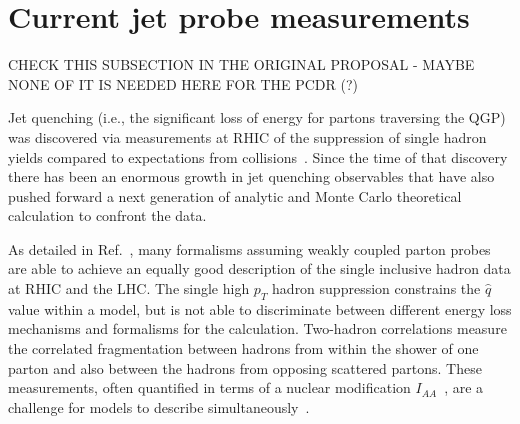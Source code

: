


\section{Current jet probe measurements}
 \label{currentjetdata}

CHECK THIS SUBSECTION IN THE ORIGINAL PROPOSAL - MAYBE NONE OF IT IS NEEDED HERE FOR THE PCDR (?)

 Jet quenching (i.e., the significant loss of energy for partons
 traversing the QGP) was discovered via measurements at RHIC of the
 suppression of single hadron yields compared to expectations from \pp
 collisions~\cite{Adcox:2001jp,Adler:2002xw}.  Since the time of that
 discovery there has been an enormous growth in jet quenching
 observables that have also pushed forward a next generation of
 analytic and Monte Carlo theoretical calculation to confront the
 data.

As detailed in Ref.~\cite{Adare:2008cg,Bass:2008rv}, many
formalisms assuming weakly coupled parton probes are able to achieve an equally
good description of the single inclusive hadron data at RHIC and the LHC.
The single high $p_T$ hadron suppression constrains
the $\hat{q}$ value within a model, but is not able to discriminate
between different energy loss mechanisms and formalisms for the
calculation.  Two-hadron correlations measure the correlated
fragmentation between hadrons from within the shower of one parton and
also between the hadrons from opposing scattered partons.  These
measurements, often quantified in terms of a nuclear modification
$I_{AA}$~\cite{Adare:2010ry,Adare:2010mq,Adams:2005ph}, are a
challenge for models to describe simultaneously~\cite{Nagle:2009wr}.

